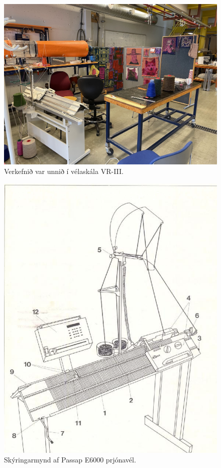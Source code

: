 \documentclass[a4paper,10pt,twocolumn]{article}
\begin{document}
\begin{figure}
    \centering
    \includegraphics[width=\linewidth]{figs/workshop.jpg}
    \caption{Verkefnið var unnið í vélaskála VR-III.}
    \label{fig:workshop}
\end{figure}

\begin{figure}
    \centering
    \includegraphics[width=\linewidth]{figs/skema-e6000.png}
    \caption{Skýringarmynd af Passap E6000 prjónavél.}
    \label{fig:skema-e6000}
\end{figure}
\end{document}
